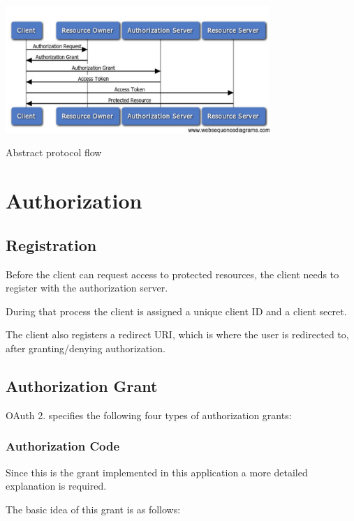  
\begin{DoxyImage}
\includegraphics[width=10cm]{flow}
\caption{\-Abstract protocol flow}
\end{DoxyImage}
\hypertarget{oauth_auth}{}\section{\-Authorization}\label{oauth_auth}
\hypertarget{oauth_registration}{}\subsection{\-Registration}\label{oauth_registration}
\-Before the client can request access to protected resources, the client needs to register with the authorization server.\par
 \-During that process the client is assigned a unique client \-I\-D and a client secret.\par
 \-The client also registers a redirect \-U\-R\-I, which is where the user is redirected to, after granting/denying authorization.\par
\hypertarget{oauth_grant}{}\subsection{\-Authorization Grant}\label{oauth_grant}
\-O\-Auth 2. specifies the following four types of authorization grants\-:\hypertarget{oauth_authcode}{}\subsubsection{\-Authorization Code}\label{oauth_authcode}
\-Since this is the grant implemented in this application a more detailed explanation is required. \par
 \-The basic idea of this grant is as follows\-:
